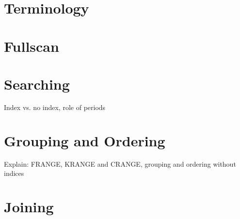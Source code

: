 \section{Terminology}

\section{Fullscan}

\section{Searching}
Index vs. no index,
role of periods 

\section{Grouping and Ordering}
Explain: FRANGE, KRANGE and CRANGE,
grouping and ordering without indices

\section{Joining}
